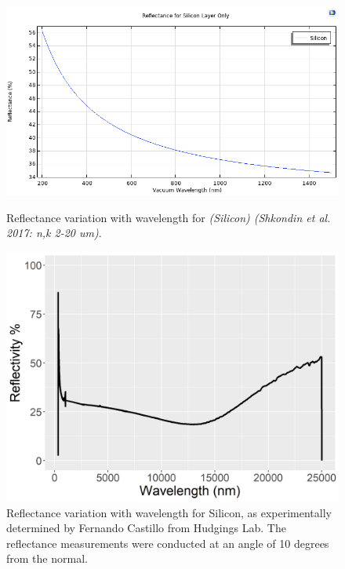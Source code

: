 \begin{figure}[H]
  \centering
  \begin{minipage}{0.48\textwidth}
    \centering
    \includegraphics[width=\textwidth]{Chapters/Figures/Chapter 4 Figures/Reflectance (SIlicon Substrate Only).png}
    \caption{Reflectance variation with wavelength for \emph{(Silicon) (Shkondin et al. 2017: n,k 2-20 um)}.}
    \label{fig:Reflectance-Silicon-Substrate}
  \end{minipage}\hfill
  \begin{minipage}{0.48\textwidth}
    \centering
    \includegraphics[width=\textwidth]{Chapters/Figures/Chapter 4 Figures/Just Silicon (Fernando's Results).png}
    \caption{Reflectance variation with wavelength for Silicon, as experimentally determined by Fernando Castillo from Hudgings Lab. The reflectance measurements were conducted at an angle of 10 degrees from the normal.}
    \label{fig:Reflectance-Fernando-Results}
  \end{minipage}
\end{figure}

